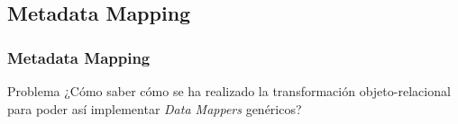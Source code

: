 \documentclass[a4paper,slidestop,xcolor=pst,blue]{beamer}
\begin{document}
\subsection{Metadata Mapping}

\begin{frame}[c]
    \frametitle{Metadata Mapping}
    \begin{block}{Problema}
        ¿Cómo saber cómo se ha realizado la transformación objeto-relacional para poder así implementar \emph{Data Mappers} genéricos?
    \end{block}
\end{frame}




%
\end{document}
